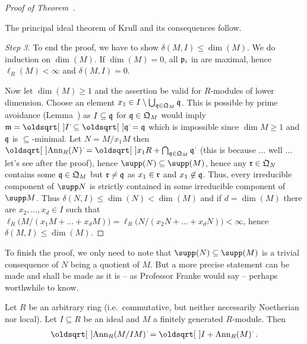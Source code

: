 \documentclass[a4paper,parskip=half,numbers=enddot, DIV=12]{scrreprt}
\begin{document}
\begin{proof}[Proof of Theorem~]
    \begin{cor*}[*facepalm*]
        The principal ideal theorem of Krull and its consequences follow.
    \end{cor*}
    
    \emph{Step 3.} To end the proof, we have to show $\delta(M,I) \leq \dim(M)$. We do induction on $\dim(M)$. If $\dim(M) = 0$, all $\mathfrak{p}_i$ in  are maximal, hence $\ell_R(M) < \infty$ and $\delta(M,I) =0$. 
    
    Now let $\dim(M)\geq 1$ and the assertion be valid for $R$-modules of lower dimension. Choose an element $x_1 \in I  \setminus \bigcup_{\mathfrak{q}\in \mathfrak{Q}_M}\mathfrak{q}$. This is possible by prime avoidance (Lemma~) as $I\subseteq \mathfrak{q}$ for $\mathfrak{q}\in\mathfrak{Q}_M$ would imply $\mm = \sqrt{I}\subseteq \sqrt{\qq} = \qq$ which is impossible since $\dim M \geq 1$ and $\mathfrak{q}$ is $\subseteq$-minimal. Let $N= M/x_1 M$ then $\sqrt{\Ann_R(N)} = \sqrt{x_1R + \bigcap_{\qq\in \QQ_M}\qq}$ (this is because $\ldots$ well $\ldots$ let's see after the proof), hence $\supp(N) \subseteq \supp(M)$, hence any $\mathfrak{r}\in \mathfrak{Q}_N$ contains some $\mathfrak{q}\in \mathfrak{Q}_M$ but $\mathfrak{r} \neq \mathfrak{q}$ as $x_1\in \mathfrak{r}$ and $x_1\not \in \mathfrak{q}$. Thus, every irreducible component of $\supp N$ is strictly contained in some irreducible component of $\supp M$. Thus $\delta(N,I) \leq \dim (N) < \dim(M)$ and if $d=\dim(M)$ there are $x_2,\ldots, x_d\in I$ such that $\ell_R\big(M/(x_1M+\ldots+x_dM)\big) = \ell_R\big(N/(x_2N+\ldots+x_dN)\big) < \infty$, hence $\delta(M,I) \leq \dim(M)$.
\end{proof}
To finish the proof, we only need to note that $\supp(N)\subseteq \supp(M)$ is a trivial consequence of $N$ being a quotient of $M$. But a more precise statement can be made and shall be made as it is -- as Professor Franke would say -- perhaps worthwhile to know. %
\begin{lem}
	Let $R$ be an arbitrary ring (i.e.\ commutative, but neither necessarily Noetherian nor local). Let $I\subseteq R$ be an ideal and $M$ a finitely generated $R$-module. Then
	\begin{align*}
		\sqrt{\Ann_R(M/IM)}=\sqrt{I+\Ann_R(M)}\;.
	\end{align*}
\end{lem}
\end{document}

